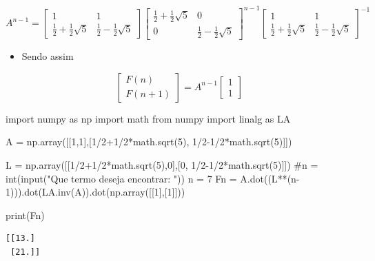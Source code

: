 \documentclass[
  letterpaper,
  DIV=11,
  numbers=noendperiod]{scrartcl}
\newenvironment{Shaded}{\begin{snugshade}}{\end{snugshade}}
\newcommand{\BuiltInTok}[1]{\textcolor[rgb]{0.00,0.23,0.31}{#1}}
\newcommand{\CommentTok}[1]{\textcolor[rgb]{0.37,0.37,0.37}{#1}}
\newcommand{\DecValTok}[1]{\textcolor[rgb]{0.68,0.00,0.00}{#1}}
\newcommand{\ImportTok}[1]{\textcolor[rgb]{0.00,0.46,0.62}{#1}}
\newcommand{\NormalTok}[1]{\textcolor[rgb]{0.00,0.23,0.31}{#1}}
\newcommand{\OperatorTok}[1]{\textcolor[rgb]{0.37,0.37,0.37}{#1}}
\providecommand{\tightlist}{%
  \setlength{\itemsep}{0pt}\setlength{\parskip}{0pt}}\usepackage{longtable,booktabs,array}
\begin{document}
\begin{tcolorbox}
\[ A^{n-1} = \begin{bmatrix}1 & 1 \\ \frac{1}{2} + \frac{1}{2}\sqrt{5} & \frac{1}{2} - \frac{1}{2}\sqrt{5}\end{bmatrix} \begin{bmatrix}\frac{1}{2} + \frac{1}{2}\sqrt{5} & 0 \\ 0 & \frac{1}{2} - \frac{1}{2}\sqrt{5}\end{bmatrix}^{n-1}\begin{bmatrix}1 & 1 \\ \frac{1}{2} + \frac{1}{2}\sqrt{5} & \frac{1}{2} - \frac{1}{2}\sqrt{5}\end{bmatrix}^{-1}\]

\begin{itemize}
\tightlist
\item
  Sendo assim
\end{itemize}

\[\begin{bmatrix}F(n) \\ F(n+1)\end{bmatrix} = A^{n-1}\begin{bmatrix}1 \\ 1\end{bmatrix}\]
\end{tcolorbox}

\begin{Shaded}
\begin{Highlighting}[]
\ImportTok{import}\NormalTok{ numpy }\ImportTok{as}\NormalTok{ np}
\ImportTok{import}\NormalTok{ math}
\ImportTok{from}\NormalTok{ numpy }\ImportTok{import}\NormalTok{ linalg }\ImportTok{as}\NormalTok{ LA}

\NormalTok{A }\OperatorTok{=}\NormalTok{ np.array([[}\DecValTok{1}\NormalTok{,}\DecValTok{1}\NormalTok{],[}\DecValTok{1}\OperatorTok{/}\DecValTok{2}\OperatorTok{+}\DecValTok{1}\OperatorTok{/}\DecValTok{2}\OperatorTok{*}\NormalTok{math.sqrt(}\DecValTok{5}\NormalTok{), }\DecValTok{1}\OperatorTok{/}\DecValTok{2}\OperatorTok{{-}}\DecValTok{1}\OperatorTok{/}\DecValTok{2}\OperatorTok{*}\NormalTok{math.sqrt(}\DecValTok{5}\NormalTok{)]])}

\NormalTok{L }\OperatorTok{=}\NormalTok{ np.array([[}\DecValTok{1}\OperatorTok{/}\DecValTok{2}\OperatorTok{+}\DecValTok{1}\OperatorTok{/}\DecValTok{2}\OperatorTok{*}\NormalTok{math.sqrt(}\DecValTok{5}\NormalTok{),}\DecValTok{0}\NormalTok{],[}\DecValTok{0}\NormalTok{, }\DecValTok{1}\OperatorTok{/}\DecValTok{2}\OperatorTok{{-}}\DecValTok{1}\OperatorTok{/}\DecValTok{2}\OperatorTok{*}\NormalTok{math.sqrt(}\DecValTok{5}\NormalTok{)]])}
\CommentTok{\#n = int(input("Que termo deseja encontrar: "))}
\NormalTok{n }\OperatorTok{=} \DecValTok{7}
\NormalTok{Fn }\OperatorTok{=}\NormalTok{ A.dot((L}\OperatorTok{**}\NormalTok{(n}\OperatorTok{{-}}\DecValTok{1}\NormalTok{))).dot(LA.inv(A)).dot(np.array([[}\DecValTok{1}\NormalTok{],[}\DecValTok{1}\NormalTok{]]))}

\BuiltInTok{print}\NormalTok{(Fn)}
\end{Highlighting}
\end{Shaded}

\begin{verbatim}
[[13.]
 [21.]]
\end{verbatim}
\end{document}
